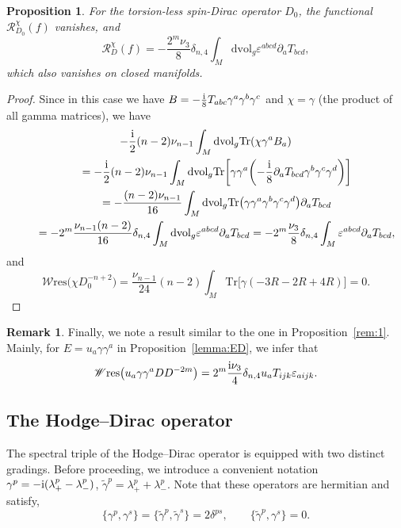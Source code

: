 \documentclass[10pt,a4paper]{amsart}
\numberwithin{equation}{section}
\newtheorem{Proposition}[Theorem]{Proposition}
\theoremstyle{definition}
\newtheorem{Remark}[Theorem]{Remark}
\def\W{\mathscr{W} \mathrm{res}}
\def\Tr{\mathrm{Tr}}
\def\dv{\mathrm{dvol}_g}
\begin{document}
\begin{Proposition}
	For the torsion-less spin-Dirac operator $D_0$, the functional $\mathscr{R}_{D_0}^\chi(f)$ vanishes, and
 \[
 \mathscr{R}_{D}^\chi(f)=-\frac{{2^m}\nu_3}{8}\delta_{n,4}\int_M\dv \varepsilon^{abcd}\partial_a T_{bcd},
 \]
 which also vanishes on closed manifolds.
\end{Proposition}
\begin{proof}
Since in this case we have $B=-\frac{\rm i}{8}T_{abc}\gamma^a\gamma^b \gamma^c$ and $\chi=\gamma$ (the product of all gamma matrices), we have
\begin{gather*}
 -\frac{\rm i}{2}(n-2)\nu_{n-1}\int_M\dv \Tr
 (\chi\gamma^a B_a)\\
 \qquad=-\frac{\rm i}{2}(n-2)\nu_{n-1}\int_M\dv \Tr\biggl[\gamma\gamma^a \biggl(-\frac{\rm i}{8}\partial_a T_{bcd} \gamma^b \gamma^c \gamma^d\biggr)\biggr]\\
 \qquad
 =-\frac{(n-2)\nu_{n-1}}{16}\int_M\dv \Tr\bigl(\gamma\gamma^a \gamma^b \gamma^c\gamma^d\bigr)\partial_a T_{bcd}\\
 \qquad=-{2^m}\frac{\nu_{n-1}(n-2)}{16}\delta_{n,4}\int_M \dv \varepsilon^{abcd} \partial_a T_{bcd}
 =-{2^m}\frac{\nu_3}{8}\delta_{n,4}\int_M \varepsilon^{abcd}\partial_a T_{bcd},
\end{gather*}
and
\[
 \W\bigl(\chi D_0^{-n+2}\bigr)=\frac{\nu_{n-1}}{24}(n-2) \int_M \Tr\bigl[\gamma(-3R-2R+4R)\bigr]=0.\tag*{\qed}
\]\renewcommand{\qed}{}
\end{proof}


\begin{Remark}
 Finally, we note a result similar to the one in Proposition~\ref{rem:1}. Mainly, for $E=u_a\gamma\gamma^a$ in Proposition~\ref{lemma:ED}, we infer that
 \[
\W\bigl(u_a\gamma\gamma^aDD^{-2m}\bigr)={2^m}\frac{{\rm i}\nu_{3}}{4}\delta_{n,4}u_a T_{ijk} \varepsilon_{aijk}.
 \]
\end{Remark}

\subsection{The Hodge--Dirac operator}

The spectral triple of the Hodge--Dirac operator is equipped with two distinct gradings. Before proceeding, we introduce a convenient notation
$
 \gamma^p = -{\rm i}(\lambda_+^p -\lambda_-^p)$, $\tilde{\gamma}^p = \lambda^p_+ +\lambda^p_-$.
Note that these operators are hermitian and satisfy,
\[
\{ \gamma^p, \gamma^s \} = \{\tilde{\gamma}^p, \tilde{\gamma}^s \} = 2 \delta^{ps},
\qquad
\{ \tilde{\gamma}^p, \gamma^s \} = 0.
\]
\end{document}
